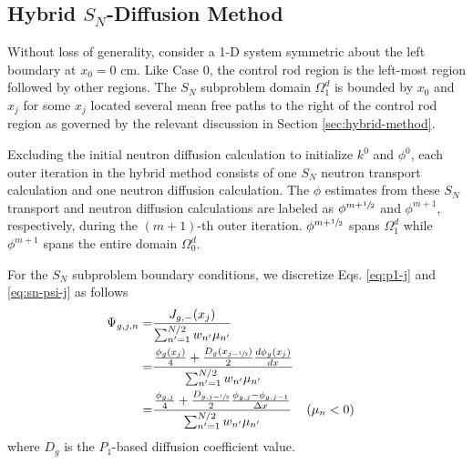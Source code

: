 \subsection{Hybrid $S_N$-Diffusion Method}

Without loss of generality, consider a 1-D system symmetric about the left boundary at $x_0=0$ cm.
Like Case 0, the control rod region is the left-most region followed by other regions. The $S_N$
subproblem domain $\Omega^d_1$ is bounded by $x_0$ and $x_j$ for some $x_j$
located several mean free paths to the right of the control rod region as governed by the relevant
discussion in Section \ref{sec:hybrid-method}.

Excluding the initial neutron diffusion calculation to initialize $k^0$ and $\phi^0$, each outer
iteration in the hybrid method consists of one $S_N$ neutron transport calculation and one neutron
diffusion calculation. The $\phi$ estimates from these $S_N$ transport and neutron diffusion
calculations are labeled as $\phi^{m+\sfrac{1}{2}}$ and $\phi^{m+1}$, respectively, during the
$(m+1)$-th outer iteration. $\phi^{m+\sfrac{1}{2}}$ spans $\Omega^d_1$ while $\phi^{m+1}$ spans
the entire domain $\Omega^d_0$.

For the $S_N$ subproblem boundary conditions, we discretize Eqs. \ref{eq:p1-j} and
\ref{eq:sn-psi-j} as follows
%
\begin{align}
  \Psi_{g,j,n} =& \frac{J_{g,-}(x_j)}{\sum^{N/2}_{n'=1}w_{n'}\mu_{n'}} \nonumber \\
  =& \frac{\frac{\phi_g(x_j)}{4}+
  \frac{D_g(x_{j-\sfrac{1}{2}})}{2}\frac{d\phi_g(x_j)}{dx}}{\sum^{N/2}_{n'=1}w_{n'}\mu_{n'}}
  \nonumber \\
  =& \frac{\frac{\phi_{g,j}}{4}+
  \frac{D_{g,j-\sfrac{1}{2}}}{2}\frac{\phi_{g,j}-\phi_{g,j-1}}{\Delta x}}
    {\sum^{N/2}_{n'=1}w_{n'}\mu_{n'}} && (\mu_n < 0) \label{eq:sn-bc}
\end{align}
%
where $D_g$ is the $P_1$-based diffusion coefficient value.

